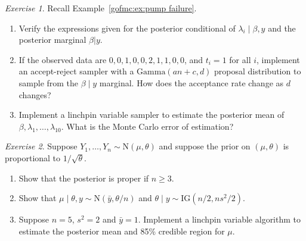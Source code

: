 \documentclass[12pt]{article}
\theoremstyle{plain}
\theoremstyle{definition}
\theoremstyle{remark}
\newtheorem{hw}{Exercise}[section]
\begin{document}
\begin{hw}\label{gofmc:hw:pump failure}
Recall Example~\ref{gofmc:ex:pump failure}.  
\begin{enumerate}
\item Verify the expressions given for the posterior conditional of
  $\lambda_i \mid \beta, y$ and the posterior marginal $\beta |y$. 
\item If the observed data are $0, 0, 1, 0, 0, 2, 1, 1, 0, 0$, and
  $t_i =1$ for all $i$, implement an accept-reject sampler with a
  $\text{Gamma}(an+c , d)$ proposal distribution to sample from the
  $\beta \mid y$ marginal.  How does the acceptance rate change as $d$
  changes? 

\item Implement a linchpin variable sampler to estimate the posterior
  mean of $\beta, \lambda_1, \ldots, \lambda_{10}$.  What is the Monte
  Carlo error of estimation? 
\end{enumerate}
\end{hw}

\begin{hw} \label{gofmc:hw:jh2001}
Suppose $Y_{1},\ldots,Y_{n} \sim \text{N}(\mu, \theta)$ and suppose
the prior on $(\mu, \theta)$ is proportional to $1/\sqrt{\theta}$. 
\begin{enumerate}
\item Show that the posterior is proper if $n \ge 3$.
\item Show that $\mu \mid \theta, y \sim \text{N}(\bar{y}, \theta /
  n)$ and $\theta \mid y \sim \text{IG}(n/2, ns^{2} / 2)$.
\item Suppose $n=5$, $s^{2} = 2$ and $\bar{y}=1$.  Implement a
  linchpin variable algorithm to estimate the posterior mean and 85\%
  credible region for $\mu$.  
\end{enumerate}
\end{hw}
\end{document}
